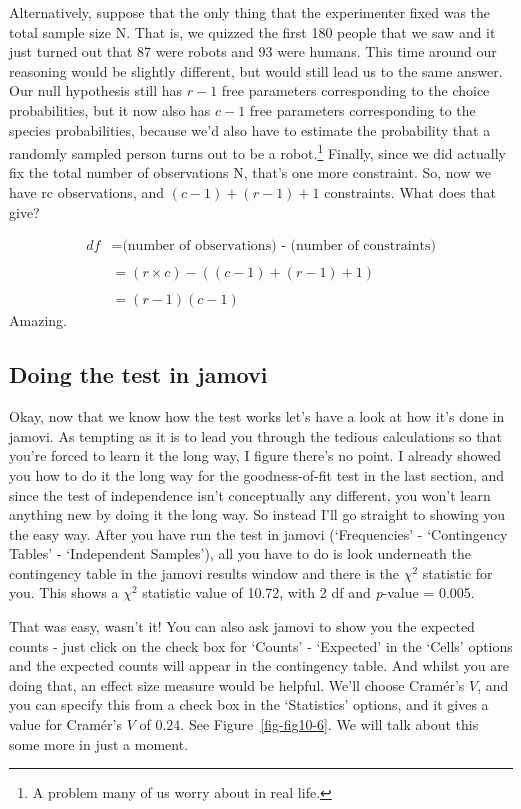 \documentclass[
  a4paper,
]{book}
\begin{document}
Alternatively, suppose that the only thing that the experimenter fixed
was the total sample size N. That is, we quizzed the first 180 people
that we saw and it just turned out that 87 were robots and 93 were
humans. This time around our reasoning would be slightly different, but
would still lead us to the same answer. Our null hypothesis still has
\(r - 1\) free parameters corresponding to the choice probabilities, but
it now also has \(c - 1\) free parameters corresponding to the species
probabilities, because we'd also have to estimate the probability that a
randomly sampled person turns out to be a robot.\footnote{A problem many
  of us worry about in real life.} Finally, since we did actually fix
the total number of observations N, that's one more constraint. So, now
we have rc observations, and \((c-1)+(r-1)+1\) constraints. What does
that give?

\[\begin{split} df & = \text{(number of
observations) - (number of constraints)} \\\\ & = (r \times c) -
((c-1) + (r - 1)+1) \\\\ & = (r - 1)(c - 1) \end{split}
\] Amazing.

\hypertarget{doing-the-test-in-jamovi-1}{%
\subsection{Doing the test in jamovi}\label{doing-the-test-in-jamovi-1}}

Okay, now that we know how the test works let's have a look at how it's
done in jamovi. As tempting as it is to lead you through the tedious
calculations so that you're forced to learn it the long way, I figure
there's no point. I already showed you how to do it the long way for the
goodness-of-fit test in the last section, and since the test of
independence isn't conceptually any different, you won't learn anything
new by doing it the long way. So instead I'll go straight to showing you
the easy way. After you have run the test in jamovi (`Frequencies' -
`Contingency Tables' - `Independent Samples'), all you have to do is
look underneath the contingency table in the jamovi results window and
there is the \(\chi^2\) statistic for you. This shows a \(\chi^2\)
statistic value of 10.72, with 2 df and \emph{p}-value = 0.005.

That was easy, wasn't it! You can also ask jamovi to show you the
expected counts - just click on the check box for `Counts' - `Expected'
in the `Cells' options and the expected counts will appear in the
contingency table. And whilst you are doing that, an effect size measure
would be helpful. We'll choose Cramér's \(V\), and you can specify this
from a check box in the `Statistics' options, and it gives a value for
Cramér's \(V\) of \(0.24\). See Figure~\ref{fig-fig10-6}. We will talk
about this some more in just a moment.
\end{document}
